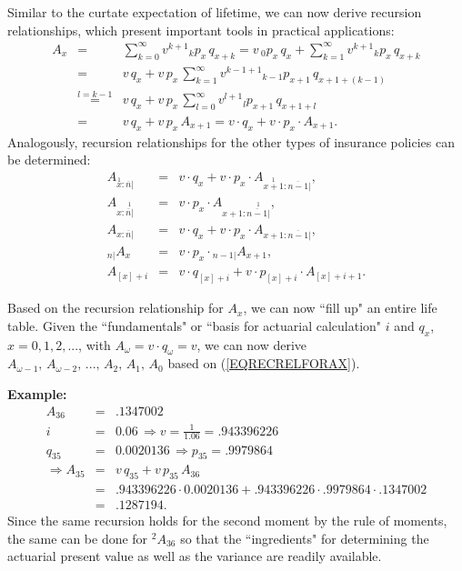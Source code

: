 \documentclass[11pt,fleqn,oneside]{book}
\begin{document}
Similar to the curtate expectation of lifetime, we can now derive recursion relationships, which present important tools in practical applications:
\begin{eqnarray}
A_x &=&  \sum_{k=0}^{\infty} v^{k+1} {_kp_x}\,{q_{x+k}} = v\,{_0p_x}\,{q_x} +  \sum_{k=1}^{\infty} v^{k+1} {_kp_x}\,{q_{x+k}}\nonumber \\
&=& v\,{q_x} +  v\,p_x\,\sum_{k=1}^{\infty} v^{k-1+1} {_{k-1}p_{x+1}}\,{q_{x+1+(k-1)}} \nonumber\\
&\stackrel{l=k-1}{=} & v\,{q_x} +  v\,p_x\,\sum_{l=0}^{\infty} v^{l+1} {_{l}p_{x+1}}\,{q_{x+1+l}} \nonumber\\
&=& v\,{q_x} +  v\,p_x\,{A_{x+1}} = v\cdot {q_x} + v\cdot p_x\cdot {A_{x+1}}. \label{EQRECRELFORAX}
\end{eqnarray}
Analogously, recursion relationships for the other types of insurance policies can be determined:
\begin{eqnarray*}
 {A_{\stackrel{1}{x}:\overline{n}|}}  &=& v\cdot {q_x} + v\cdot p_x\cdot {A_{\stackrel{1}{x+1}:\overline{n-1}|}},\\
 {A_{x:\stackrel{1}{\overline{n}|}}} &=& v\cdot p_x \cdot  {A_{x+1:\stackrel{1}{\overline{n-1}|}}}, \\
 {A_{x:\overline{n}|}} &=& v\cdot q_x + v\cdot p_x \cdot {A_{x+1:\overline{n-1}|}},\\
 {_{n|}A_x}  &=& v\cdot p_x \cdot {_{n-1|}A_{x+1}},\\
 A_{[x]+i} &=& v\cdot {q_{[x]+i}} + v\cdot p_{[x]+i}\cdot {A_{[x]+i+1}}.
\end{eqnarray*}

Based on the recursion relationship for $A_x$, we can now ``fill up" an entire life table. Given the ``fundamentals" or ``basis for actuarial calculation" $i$ and $q_x$, $x=0,1,2,...$, with $A_{\omega} = v\cdot q_{\omega} = v$, we can now derive $A_{\omega-1},\,A_{\omega-2},\,...,\, A_2,\,A_1,\,A_0$ based on (\ref{EQRECRELFORAX}).  

\noindent \textbf{Example:} 
\begin{eqnarray*}
A_{36} &=& .1347002 \\
i &=& 0.06 \, \Rightarrow v = \frac{1}{1.06} = .943396226\\
q_{35} &=& 0.0020136 \, \Rightarrow p_{35} = .9979864 \\
\Rightarrow A_{35} &=& v\,q_{35} + v\,p_{35}\,A_{36}\\
&=&.943396226\cdot 0.0020136 + .943396226\cdot .9979864\cdot .1347002\\
&=& .1287194.
\end{eqnarray*}
Since the same recursion holds for the second moment by the rule of moments, the same can be done for $^2A_{36}$ so that the ``ingredients" for determining the actuarial present value as well as the variance are readily available. 
\end{document}
